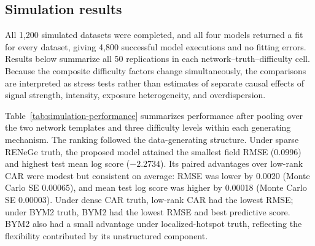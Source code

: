 \documentclass[11pt]{article}
\begin{document}
\subsection{Simulation results}

All 1,200 simulated datasets were completed, and all four models returned a fit for every dataset, giving 4,800 successful model executions and no fitting errors. Results below summarize all 50 replications in each network--truth--difficulty cell. Because the composite difficulty factors change simultaneously, the comparisons are interpreted as stress tests rather than estimates of separate causal effects of signal strength, intensity, exposure heterogeneity, and overdispersion.

Table~\ref{tab:simulation-performance} summarizes performance after pooling over the two network templates and three difficulty levels within each generating mechanism. The ranking followed the data-generating structure. Under sparse RENeGe truth, the proposed model attained the smallest field RMSE (0.0996) and highest test mean log score ($-2.2734$). Its paired advantages over low-rank CAR were modest but consistent on average: RMSE was lower by 0.0020 (Monte Carlo SE 0.00065), and mean test log score was higher by 0.00018 (Monte Carlo SE 0.00003). Under dense CAR truth, low-rank CAR had the lowest RMSE; under BYM2 truth, BYM2 had the lowest RMSE and best predictive score. BYM2 also had a small advantage under localized-hotspot truth, reflecting the flexibility contributed by its unstructured component.
\end{document}
